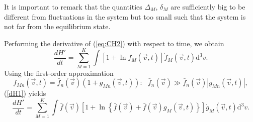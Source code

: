 It is important to remark that the quantities $\Delta_M$, $\delta_M$ are
sufficiently big to be different from fluctuations in the system but too small
such that the system is not far from the equilibrium state.  

Performing the derivative of (\ref{eq:CH2}) with respect to time, we obtain
%
\begin{equation}\label{dH1}
    \frac{dH'}{dt}=\sum_{M=1}^{K}\int\left[
      1+\ln f_M(\vec{v},t)
    \right]\dot f_M(\vec{v},t)\mathrm{d}^3v.
\end{equation}
%
Using the first-order approximation
%
\begin{equation}\label{firstorder}
   f_{Mn}(\vec{v},t)=\bar{f}_{n}(\vec{v})(1+g_{Mn}(\vec{v},t)): \ \ \ 
   \bar{f}_{n}(\vec{v})\gg \bar{f}_{n}(\vec{v})|g_{Mn}(\vec{v},t)|,
\end{equation}
%
(\ref{dH1}) yields
%
\begin{equation}\label{dH1-1}
    \frac{dH'}{dt}=\sum_{M=1}^{K}\int\bar f(\vec{v}) \left[
      1+\ln \left\{
        \bar f(\vec{v})+\bar f(\vec{v})g_M(\vec{v},t)
      \right\}
    \right]\dot g_M(\vec{v},t)\mathrm{d}^3v.
\end{equation}
%

